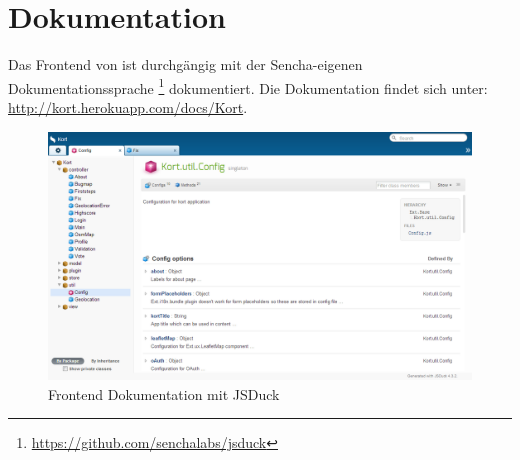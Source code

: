 \section{Dokumentation}

Das Frontend von \kort{} ist durchgängig mit der Sencha-eigenen Dokumentationssprache \footnote{\url{https://github.com/senchalabs/jsduck}} dokumentiert.
Die Dokumentation findet sich unter: \url{http://kort.herokuapp.com/docs/Kort}.

\begin{figure}[H]
	\centering
	\includegraphics[width=\textwidth]{images/implementation/frontend/kort-documentation}
	\caption{Frontend Dokumentation mit JSDuck}
	\label{image-kort-documentation}
\end{figure}